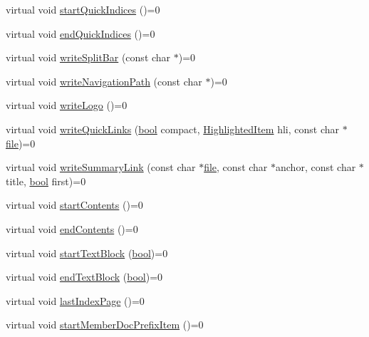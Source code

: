 \begin{DoxyCompactItemize}
\item 
virtual void \hyperlink{class_output_generator_ac1235b655cd828140b9c76f4ca1f4040}{start\+Quick\+Indices} ()=0
\item 
virtual void \hyperlink{class_output_generator_ac772c3fa9b9fb938598b67b8251a1787}{end\+Quick\+Indices} ()=0
\item 
virtual void \hyperlink{class_output_generator_a7ca68513534b42f774af0615039298af}{write\+Split\+Bar} (const char $\ast$)=0
\item 
virtual void \hyperlink{class_output_generator_a782d69569d902413c0029b12cd4ea2d6}{write\+Navigation\+Path} (const char $\ast$)=0
\item 
virtual void \hyperlink{class_output_generator_a4a253e01f787c22716b14709344535ab}{write\+Logo} ()=0
\item 
virtual void \hyperlink{class_output_generator_ade0bf7d098652c8592a8790d6de80a7e}{write\+Quick\+Links} (\hyperlink{qglobal_8h_a1062901a7428fdd9c7f180f5e01ea056}{bool} compact, \hyperlink{index_8h_a6643b7765422a7eb577f0b2ed8fb2e09}{Highlighted\+Item} hli, const char $\ast$\hyperlink{class_output_generator_aed5ad11c3844cdf71ec6fee6c1c84286}{file})=0
\item 
virtual void \hyperlink{class_output_generator_aa27b1e7554ca5a8f4d80bf82bc1666d6}{write\+Summary\+Link} (const char $\ast$\hyperlink{class_output_generator_aed5ad11c3844cdf71ec6fee6c1c84286}{file}, const char $\ast$anchor, const char $\ast$title, \hyperlink{qglobal_8h_a1062901a7428fdd9c7f180f5e01ea056}{bool} first)=0
\item 
virtual void \hyperlink{class_output_generator_a21231e6bba1594e5327e8e150e39355c}{start\+Contents} ()=0
\item 
virtual void \hyperlink{class_output_generator_a62d0b8915ba8cbae0e0703794bcae68a}{end\+Contents} ()=0
\item 
virtual void \hyperlink{class_output_generator_ae06da65c60fe1508152999a76c3b8d80}{start\+Text\+Block} (\hyperlink{qglobal_8h_a1062901a7428fdd9c7f180f5e01ea056}{bool})=0
\item 
virtual void \hyperlink{class_output_generator_a53f79d9816008132480d3d454e14251b}{end\+Text\+Block} (\hyperlink{qglobal_8h_a1062901a7428fdd9c7f180f5e01ea056}{bool})=0
\item 
virtual void \hyperlink{class_output_generator_a12d53790300c52b68bc0715ab05507d2}{last\+Index\+Page} ()=0
\item 
virtual void \hyperlink{class_output_generator_acbb6ecd186cadcea8526b54e2ba7d166}{start\+Member\+Doc\+Prefix\+Item} ()=0

\end{DoxyCompactItemize}
